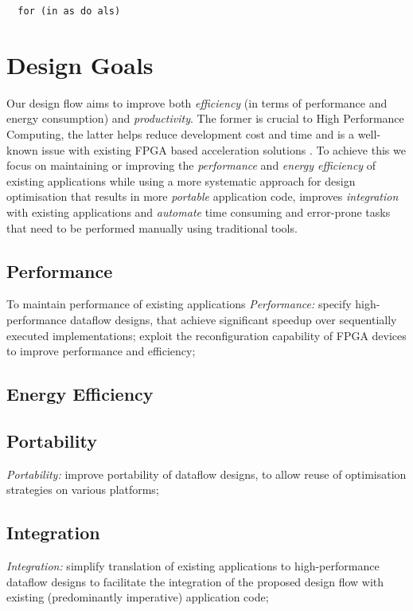 \begin{lstlisting}
  for (in as do als)
\end{lstlisting}

\section{Design Goals}

Our design flow aims to improve both \emph{efficiency} (in terms of
performance and energy consumption) and \emph{productivity}. The
former is crucial to High Performance Computing, the latter helps
reduce development cost and time and is a well-known issue with
existing FPGA based acceleration solutions . To achieve this we focus
on maintaining or improving the \emph{performance} and \emph{energy
  efficiency} of existing applications while using a more systematic
approach for design optimisation that results in more \emph{portable}
application code, improves \emph{integration} with existing
applications and \emph{automate} time consuming and error-prone tasks
that need to be performed manually using traditional tools.

\subsection{Performance}
To maintain performance of existing applications
\emph{Performance:} specify high-performance dataflow designs,
that achieve significant speedup over sequentially executed
implementations; exploit the reconfiguration capability of FPGA
devices to improve performance and efficiency;

\subsection{Energy Efficiency}

\subsection{Portability}
\emph{Portability:} improve portability of dataflow designs, to
allow reuse of optimisation strategies on various platforms;

\subsection{Integration}
\emph{Integration:} simplify translation of existing
applications to high-performance dataflow designs to facilitate the
integration of the proposed design flow with existing (predominantly
imperative) application code;

